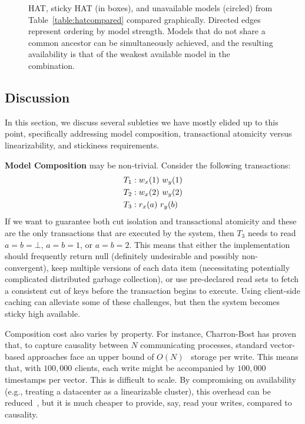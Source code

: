 \begin{figure}
\label{fig:hat-order}
\caption{HAT, sticky HAT (in boxes), and unavailable models (circled)
  from Table~\protect\ref{table:hatcompared} compared
  graphically. Directed edges represent ordering by model
  strength. Models that do not share a common ancestor can be
  simultaneously achieved, and the resulting availability is that of
  the weakest available model in the combination.}
\label{fig:hatcompared}
\end{figure}


\subsection{Discussion}
\label{sec:discussion}

In this section, we discuss several subleties we have mostly elided up
to this point, specifically addressing model composition,
transactional atomicity versus linearizability, and stickiness
requirements.

\noindent\textbf{Model Composition} may be non-trivial. Consider the following transactions:
\begin{align*}
\small
T_1 &: w_x(1)~w_y(1)
\\T_2 &: w_x(2)~w_y(2)
\\T_3 &: r_x(a)~r_y(b)
\end{align*}
If we want to guarantee both cut isolation and transactional atomicity
and these are the only transactions that are executed by the system,
then $T_3$ needs to read $a=b=\bot$, $a=b=1$, or $a=b=2$. This means
that either the implementation should frequently return null
(definitely undesirable and possibly non-convergent), keep multiple
versions of each data item (necessitating potentially complicated
distributed garbage collection), or use pre-declared read sets to
fetch a consistent cut of keys before the transaction begins to
execute. Using client-side caching can alleviate some of these
challenges, but then the system becomes sticky high available.

Composition cost also varies by property. For instance, Charron-Bost
has proven that, to capture causality between $N$ communicating
processes, standard vector-based approaches face an upper bound of
$O(N)$~\cite{charron-bost} storage per write. This means that, with
$100,000$ clients, each write might be accompanied by $100,000$
timestamps per vector. This is difficult to scale. By compromising on
availability (e.g., treating a datacenter as a linearizable cluster),
this overhead can be reduced~\cite{cops, eiger}, but it is much
cheaper to provide, say, read your writes, compared to causality.

